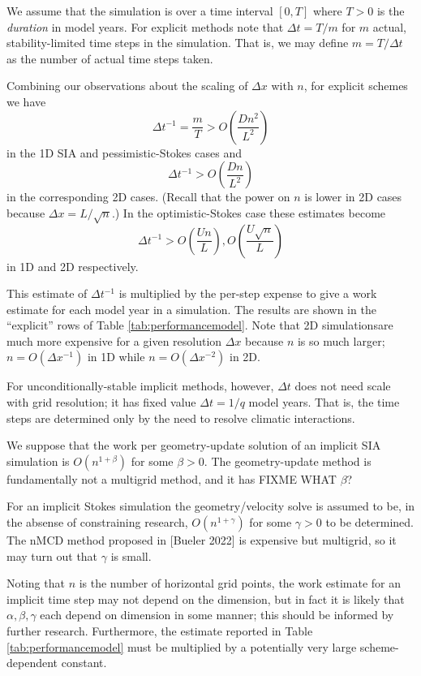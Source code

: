 \documentclass[twocolumn,letterpaper]{igs}
\begin{document}
We assume that the simulation is over a time interval $[0,T]$ where $T>0$ is the \emph{duration} in model years.  For explicit methods note that $\Delta t = T/m$ for $m$ actual, stability-limited time steps in the simulation.  That is, we may define $m=T/\Delta t$ as the number of actual time steps taken.

Combining our observations about the scaling of $\Delta x$ with $n$, for explicit schemes we have
\begin{equation}
\Delta t^{-1} = \frac{m}{T} > O\left(\frac{D n^2}{L^2}\right)
\end{equation}
in the 1D SIA and pessimistic-Stokes cases and
\begin{equation}
\Delta t^{-1} > O\left(\frac{D n}{L^2}\right)
\end{equation}
in the corresponding 2D cases.  (Recall that the power on $n$ is lower in 2D cases because $\Delta x = L/\sqrt{n}$.)  In the optimistic-Stokes case these estimates become
\begin{equation}
\Delta t^{-1} > O\left(\frac{U n}{L}\right), O\left(\frac{U \sqrt{n}}{L}\right)
\end{equation}
in 1D and 2D respectively.

This estimate of $\Delta t^{-1}$ is multiplied by the per-step expense to give a work estimate for each model year in a simulation.  The results are shown in the ``explicit'' rows of Table \ref{tab:performancemodel}.  Note that 2D simulationsare much more expensive for a given resolution $\Delta x$ because $n$ is so much larger; $n = O(\Delta x^{-1})$ in 1D while $n = O(\Delta x^{-2})$ in 2D.

For unconditionally-stable implicit methods, however, $\Delta t$ does not need scale with grid resolution; it has fixed value $\Delta t = 1/q$ model years.  That is, the time steps are determined only by the need to resolve climatic interactions.

We suppose that the work per geometry-update solution of an implicit SIA simulation is $O(n^{1+\beta})$ for some $\beta>0$.  The \cite{Bueler2016} geometry-update method is fundamentally not a multigrid method, and it has FIXME WHAT $\beta$?

For an implicit Stokes simulation the geometry/velocity solve is assumed to be, in the absense of constraining research, $O(n^{1+\gamma})$ for some $\gamma>0$ to be determined.  The nMCD method proposed in [Bueler 2022] is expensive but multigrid, so it may turn out that $\gamma$ is small.

Noting that $n$ is the number of horizontal grid points, the work estimate for an implicit time step may not depend on the dimension, but in fact it is likely that $\alpha,\beta,\gamma$ each depend on dimension in some manner; this should be informed by further research.  Furthermore, the estimate reported in Table \ref{tab:performancemodel} must be multiplied by a potentially very large scheme-dependent constant.
\end{document}
